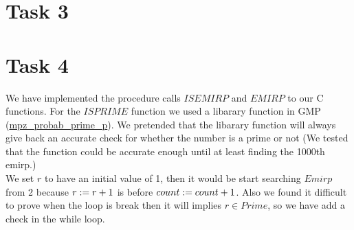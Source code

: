 \documentclass[a4paper,12pt,fleqn]{scrartcl}
\begin{document}
\section{Task 3} 


\section{Task 4}
We have implemented the procedure calls $ISEMIRP$ and $EMIRP$ to our C functions.
For the $ISPRIME$ function we used a libarary function in GMP
(\url{mpz_probab_prime_p}). We pretended that the libarary function will always
give back an accurate check for whether the number is a prime or not (We tested that 
the function could be accurate enough until at least finding the 1000th emirp.)\\
We set $r$ to have an initial value of 1, then it would be start
searching $Emirp$ from 2 because $ r \mathrel{:=} r +1 $ is before 
$ count \mathrel{:=} count +1 $. Also we found it difficult to prove when the 
loop is break then it will implies $r \in Prime$, so we have add a check 
in the while loop. 
\end{document}
